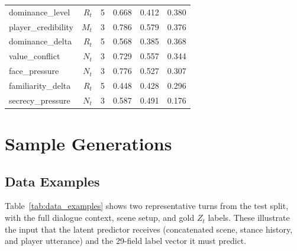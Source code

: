 \documentclass[11pt]{article}
\begin{document}
\begin{table}[tp]
\begin{tabular}{@{}lrrrrr@{}}
dominance\_level  & $R_t$ & 5  & 0.668 & 0.412 & 0.380 \\
player\_credibility & $M_t$ & 3 & 0.786 & 0.579 & 0.376 \\
dominance\_delta  & $R_t$ & 5  & 0.568 & 0.385 & 0.368 \\
value\_conflict   & $N_t$ & 3  & 0.729 & 0.557 & 0.344 \\
face\_pressure    & $N_t$ & 3  & 0.776 & 0.527 & 0.307 \\
familiarity\_delta& $R_t$ & 5  & 0.448 & 0.428 & 0.296 \\
secrecy\_pressure & $N_t$ & 3  & 0.587 & 0.491 & 0.176 \\
\bottomrule
\end{tabular}
\end{table}

\section{Sample Generations}
\label{app:samples}

\subsection{Data Examples}
\label{app:data_examples}

Table~\ref{tab:data_examples} shows two representative turns from the test split, with the full dialogue context, scene setup, and gold $Z_t$ labels.
These illustrate the input that the latent predictor receives (concatenated scene, stance history, and player utterance) and the 29-field label vector it must predict.
\end{document}
